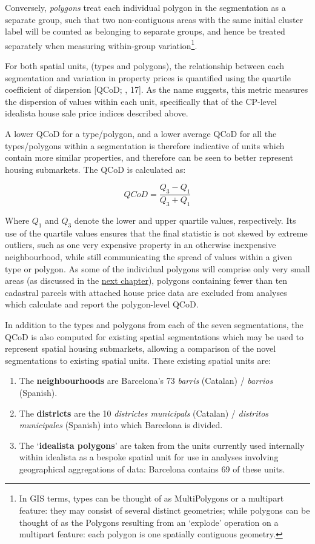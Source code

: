 \documentclass[a4paper, nobind]{templates/ociamthesis}
\providecommand{\tightlist}{%
  \setlength{\itemsep}{0pt}\setlength{\parskip}{0pt}}
\begin{document}
Conversely, \emph{polygons} treat each individual polygon in the segmentation as a separate group, such that two non-contiguous areas with the same initial cluster label will be counted as belonging to separate groups, and hence be treated separately when measuring within-group variation\footnote{In GIS terms, types can be thought of as MultiPolygons or a multipart feature: they may consist of several distinct geometries; while polygons can be thought of as the Polygons resulting from an `explode' operation on a multipart feature: each polygon is one spatially contiguous geometry.}.

For both spatial units, (types and polygons), the relationship between each segmentation and variation in property prices is quantified using the quartile coefficient of dispersion {[}QCoD; \citet{zwillinger1999}, 17{]}. As the name suggests, this metric measures the dispersion of values within each unit, specifically that of the CP-level idealista house sale price indices described above.

A lower QCoD for a type/polygon, and a lower average QCoD for all the types/polygons within a segmentation is therefore indicative of units which contain more similar properties, and therefore can be seen to better represent housing submarkets. The QCoD is calculated as:

\[
QCoD=\frac{Q_{3}-Q_{1}}{Q_{3}+Q_{1}}
\]

Where \(Q_1\) and \(Q_3\) denote the lower and upper quartile values, respectively. Its use of the quartile values ensures that the final statistic is not skewed by extreme outliers, such as one very expensive property in an otherwise inexpensive neighbourhood, while still communicating the spread of values within a given type or polygon. As some of the individual polygons will comprise only very small areas (as discussed in the \protect\hyperlink{polygon-metrics}{next chapter}), polygons containing fewer than ten cadastral parcels with attached house price data are excluded from analyses which calculate and report the polygon-level QCoD.

In addition to the types and polygons from each of the seven segmentations, the QCoD is also computed for existing spatial segmentations which may be used to represent spatial housing submarkets, allowing a comparison of the novel segmentations to existing spatial units. These existing spatial units are:

\begin{enumerate}
\def\labelenumi{\arabic{enumi}.}
\tightlist
\item
  The \textbf{neighbourhoods} are Barcelona's 73 \emph{barris} (Catalan) / \emph{barrios} (Spanish).
\item
  The \textbf{districts} are the 10 \emph{districtes municipals} (Catalan) / \emph{distritos municipales} (Spanish) into which Barcelona is divided.
\item
  The `\textbf{idealista polygons}' are taken from the units currently used internally within idealista as a bespoke spatial unit for use in analyses involving geographical aggregations of data: Barcelona contains 69 of these units.
\end{enumerate}
\end{document}
